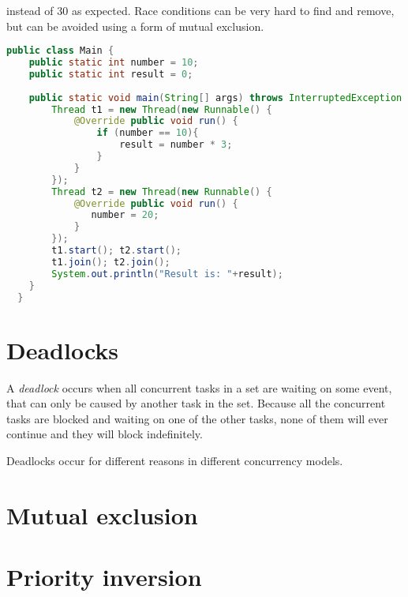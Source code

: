 instead of 30 as expected. Race conditions can be very hard to find and remove, but can be avoided using a form of mutual exclusion.
\begin{lstlisting}[float,label=lst:racecondition,
  caption={Race condition example},
  language=Java,  
  showspaces=false,
  showtabs=false,
  breaklines=true,
  showstringspaces=false,
  breakatwhitespace=true,
  commentstyle=\color{greencomments},
  keywordstyle=\color{bluekeywords},
  stringstyle=\color{redstrings}]  % Start your code-block
public class Main {
    public static int number = 10;
    public static int result = 0;
    
    public static void main(String[] args) throws InterruptedException {
        Thread t1 = new Thread(new Runnable() {
            @Override public void run() {
                if (number == 10){
                    result = number * 3;
                }
            }
        });
        Thread t2 = new Thread(new Runnable() {
            @Override public void run() {
               number = 20;
            }
        });
        t1.start(); t2.start();
        t1.join(); t2.join();
        System.out.println("Result is: "+result);
    }
  }
\end{lstlisting}

 
\section{Deadlocks}
A \emph{deadlock} occurs when all concurrent tasks in a set are waiting on some event, that can only be caused by another task in the set\cite[p. 435]{tanenbaum2008modern}. Because all the concurrent tasks are blocked and waiting on one of the other tasks, none of them will ever continue and they will block indefinitely.


Deadlocks occur for different reasons in different concurrency models.

\section{Mutual exclusion}
\section{Priority inversion}
 
\worksheetend
